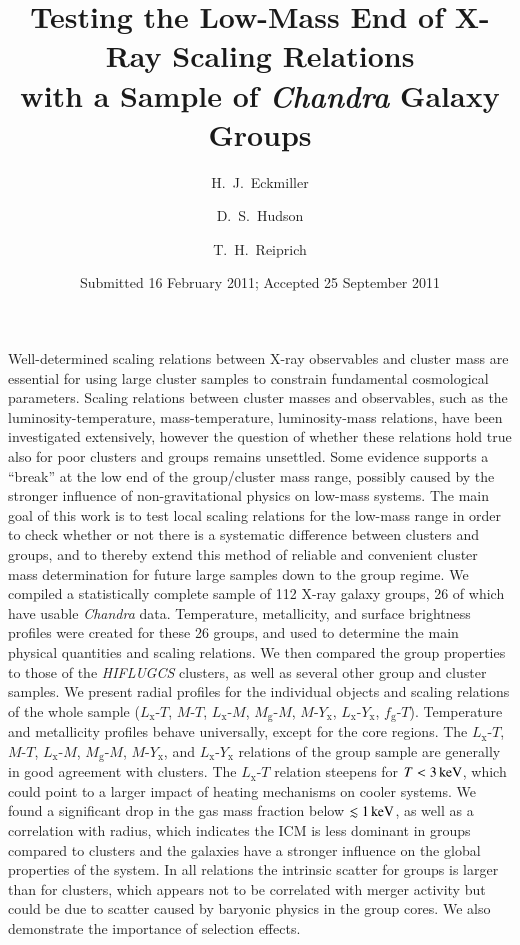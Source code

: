 \documentclass[structabstract]{aa}
\begin{document}
%
\title{Testing the Low-Mass End of X-Ray Scaling Relations\\ with a Sample of \emph{Chandra} Galaxy Groups}
\author{H.~J.~Eckmiller
\and D.~S.~Hudson
\and T.~H.~Reiprich}
\date{Submitted 16 February 2011; Accepted 25 September 2011}
\abstract
{Well-determined scaling relations between X-ray observables and cluster mass
  are essential for using large cluster samples to constrain fundamental
  cosmological parameters. Scaling relations between cluster masses and
  observables, such as the luminosity-temperature, mass-temperature,
  luminosity-mass relations, have been investigated extensively, however the
  question of whether these relations hold true also for poor clusters and
  groups remains unsettled. Some evidence supports a ``break'' at the low end
  of the group/cluster mass range, possibly caused by the stronger influence
  of non-gravitational physics on low-mass systems.}
{The main goal of this work is to test local scaling relations for the low-mass range in
  order to check whether or not there is a systematic difference
  between clusters and groups, and to thereby extend this method of reliable and
  convenient cluster mass determination for future large samples down to the group regime.}
{We compiled a statistically complete sample of 112 X-ray galaxy groups, 26 of
  which have usable \emph{Chandra} data. Temperature, metallicity, and surface
  brightness profiles were created for these 26 groups, and used to determine
  the main physical quantities and scaling relations. We then compared the
  group properties to those of the \emph{HIFLUGCS} clusters, as well as several other
  group and cluster samples.}
{We present radial profiles for the individual objects and scaling
  relations of the whole sample ($L_{\text{x}}$-$T$, $M$-$T$,
  $L_{\text{x}}$-$M$, $M_{\text{g}}$-$M$, $M$-$Y_{\text{x}}$,
  $L_{\text{x}}$-$Y_{\text{x}}$, $f_{\text{g}}$-$T$). Temperature
  and metallicity profiles behave universally, except for the
    core regions. The $L_{\text{x}}$-$T$, $M$-$T$,
  $L_{\text{x}}$-$M$, $M_{\text{g}}$-$M$, $M$-$Y_{\text{x}}$, and
  $L_{\text{x}}$-$Y_{\text{x}}$ relations of the group sample are
  generally in good agreement with clusters. The $L_{\text{x}}$-$T$
  relation steepens for $T<\unit[3]{keV}$, which could point to a
  larger impact of heating mechanisms on cooler systems. We found a
  significant drop in the gas mass fraction below $\unit[\lesssim
  1]{keV}$, as well as a correlation with radius, which indicates the
  ICM is less dominant in groups compared to clusters and the
    galaxies have a stronger influence on the global properties of the
    system. In all relations the intrinsic scatter for
    groups is larger than for clusters, which appears not to be
    correlated with merger activity but could be due to scatter caused
    by baryonic physics in the group cores. We also demonstrate
    the importance of selection effects.}
\end{document}
